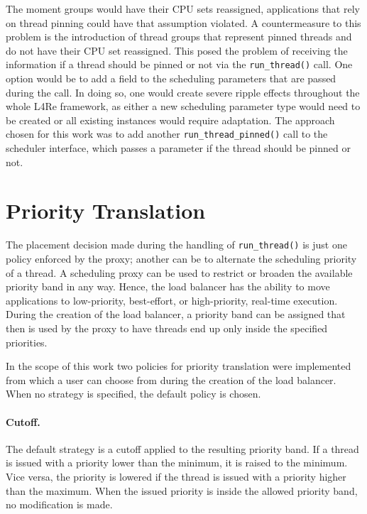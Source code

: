 The moment groups would have their CPU sets reassigned, applications that rely on thread pinning could have that assumption violated.
A countermeasure to this problem is the introduction of thread groups that represent pinned threads and do not have their CPU set reassigned.
This posed the problem of receiving the information if a thread should be pinned or not via the \texttt{run\_thread()} call.
One option would be to add a field to the scheduling parameters that are passed during the call.
In doing so, one would create severe ripple effects throughout the whole L4Re framework, as either a new scheduling parameter type would need to be created or all existing instances would require adaptation.
The approach chosen for this work was to add another \texttt{run\_thread\_pinned()} call to the scheduler interface, which passes a parameter if the thread should be pinned or not.

\section{Priority Translation}

The placement decision made during the handling of \texttt{run\_thread()} is just one policy enforced by the proxy; another can be to alternate the scheduling priority of a thread.
A scheduling proxy can be used to restrict or broaden the available priority band in any way.
Hence, the load balancer has the ability to move applications to low-priority, best-effort, or high-priority, real-time execution.
During the creation of the load balancer, a priority band can be assigned that then is used by the proxy to have threads end up only inside the specified priorities.

In the scope of this work two policies for priority translation were implemented from which a user can choose from during the creation of the load balancer.
When no strategy is specified, the default policy is chosen.

\paragraph{Cutoff.}

The default strategy is a cutoff applied to the resulting priority band.
If a thread is issued with a priority lower than the minimum, it is raised to the minimum.
Vice versa, the priority is lowered if the thread is issued with a priority higher than the maximum.
When the issued priority is inside the allowed priority band, no modification is made.

